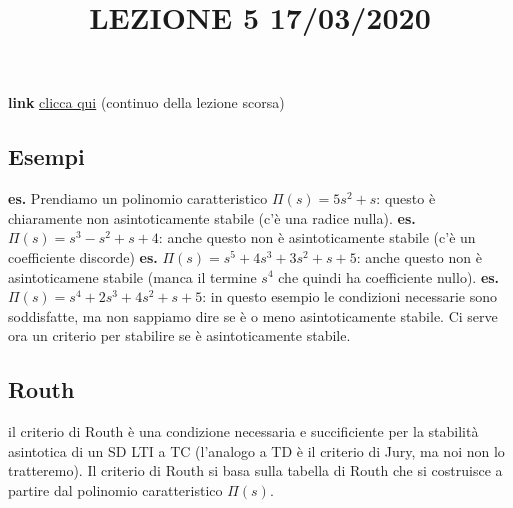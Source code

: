 \title{LEZIONE 5 17/03/2020}\newline
\textbf{link} \href{https://web.microsoftstream.com/video/72b5f396-c34b-4ff6-8d6e-44bf6832dd2e?list=user&userId=faa91214-a6f5-40d7-8875-253fd49b8ce1}{clicca qui}\newline
\newline
(continuo della lezione scorsa)
\subsection{Esempi}
\textbf{es.} Prendiamo un polinomio caratteristico $\Pi(s) = 5 s^2 +s$: questo è chiaramente non asintoticamente stabile (c'è una radice nulla).\newline
\newline
\textbf{es.} $\Pi(s) = s^3 -s^2 +s +4$: anche questo non è asintoticamente stabile (c'è un coefficiente discorde)\newline
\newline
\textbf{es.} $\Pi(s) = s^5 +4 s^3 +3s^2 +s + 5$: anche questo non è asintoticamene stabile (manca il termine $s^4$ che quindi ha coefficiente nullo).\newline
\newline
\textbf{es.} $\Pi(s) = s^4 +2s^3+4s^2+s+5$: in questo esempio le condizioni necessarie sono soddisfatte, ma non sappiamo dire se è o meno asintoticamente stabile. Ci serve ora un criterio per stabilire se è asintoticamente stabile.
\subsection{Routh}
il criterio di Routh è una condizione necessaria e succificiente per la stabilità asintotica di un SD LTI a TC (l'analogo a TD è il criterio di Jury, ma noi non lo tratteremo).\newline
\newline
Il criterio di Routh si basa sulla tabella di Routh che si costruisce a partire dal polinomio caratteristico $\Pi(s)$.
